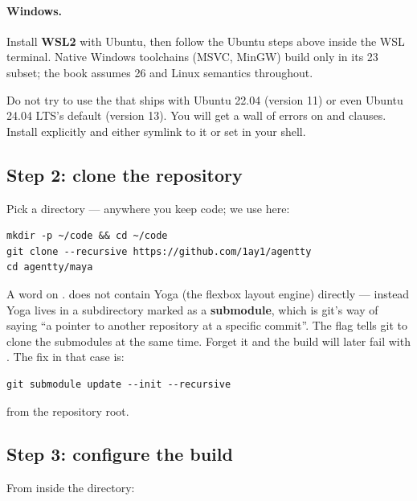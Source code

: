 \paragraph{Windows.}
Install \textbf{WSL2} with Ubuntu, then follow the Ubuntu steps
above inside the WSL terminal. Native Windows toolchains (MSVC,
MinGW) build \maya{} only in its \cpp{}23 subset; the book assumes
\cpp{}26 and Linux semantics throughout.

\begin{warning}
Do not try to use the  that ships with Ubuntu 22.04
(version 11) or even Ubuntu 24.04 LTS's default (version 13). You
will get a wall of errors on  and 
clauses. Install  explicitly and either symlink
 to it or set  in your shell.
\end{warning}

\subsection{Step 2: clone the repository}

Pick a directory --- anywhere you keep code; we use  here:

\begin{lstlisting}[style=shell]
mkdir -p ~/code && cd ~/code
git clone --recursive https://github.com/1ay1/agentty
cd agentty/maya
\end{lstlisting}

A word on . \maya{} does not contain Yoga
(the flexbox layout engine) directly --- instead Yoga lives in a
subdirectory marked as a \textbf{submodule}, which is git's way of
saying ``a pointer to another repository at a specific commit''. The
 flag tells git to clone the submodules at the same
time. Forget it and the build will later fail with
. The fix
in that case is:

\begin{lstlisting}[style=shell]
git submodule update --init --recursive
\end{lstlisting}

from the repository root.

\subsection{Step 3: configure the build}

From inside the  directory:

